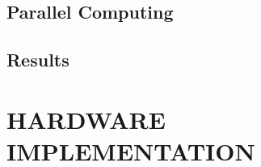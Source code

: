 \documentclass[letterpaper, 10 pt, conference]{ieeeconf}  %
\begin{document}
    

\subsection{Parallel Computing}

\subsection{Results}


      





\section{HARDWARE IMPLEMENTATION}

 

\end{document}

